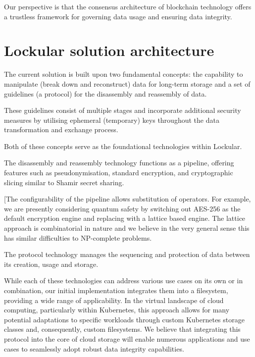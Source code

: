 \documentclass{tufte-handout}
\begin{document}
Our perspective is that the consensus architecture of blockchain technology offers a trustless framework for governing data usage and ensuring data integrity.

\section{Lockular solution architecture}\label{sec:page-layout}
The current solution is built upon two fundamental concepts: the capability to manipulate (break down and reconstruct) data for long-term storage and a set of guidelines (a protocol) for the
disassembly and reassembly of data.

These guidelines consist of multiple stages and incorporate additional security measures by utilising ephemeral (temporary) keys throughout the data transformation and exchange process.

Both of these concepts serve as the foundational technologies within Lockular.

The disassembly and reassembly technology functions as a pipeline, offering features such as pseudonymisation, standard encryption, and cryptographic slicing similar to Shamir secret sharing.

[The configurability of the pipeline allows substitution of operators. For example, we are presently considering quantum safety by switching out AES-256 as the default encryption engine and
replacing with a lattice based engine. The lattice approach is combinatorial in nature and we believe in the very general sense this has similar difficulties to NP-complete problems.

The protocol technology manages the sequencing and protection of data between its creation, usage and storage.

While each of these technologies can address various use cases on its own or in combination, our initial implementation integrates them into a filesystem, providing a wide range of applicability.
In the virtual landscape of cloud computing, particularly within Kubernetes, this approach allows for many potential adaptations to specific workloads through custom Kubernetes storage classes and,
consequently, custom filesystems.
We believe that integrating this protocol into the core of cloud storage will enable numerous applications and use cases to seamlessly adopt robust data integrity capabilities.
\end{document}
